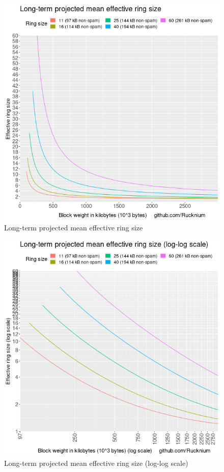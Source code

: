 \documentclass[usletter,11pt,english,openany]{article}
\begin{document}
\begin{figure}[H]
\caption{Long-term projected mean effective ring size}
\label{fig-projected-effective-ring-size-non-log}
\centering{}\includegraphics[scale=0.5]{images/projected-effective-ring-size-non-log}
\end{figure}

\begin{figure}[H]
\caption{Long-term projected mean effective ring size (log-log scale)}
\label{fig-projected-effective-ring-size-log-log}
\centering{}\includegraphics[scale=0.5]{images/projected-effective-ring-size-log-log}
\end{figure}
\end{document}
